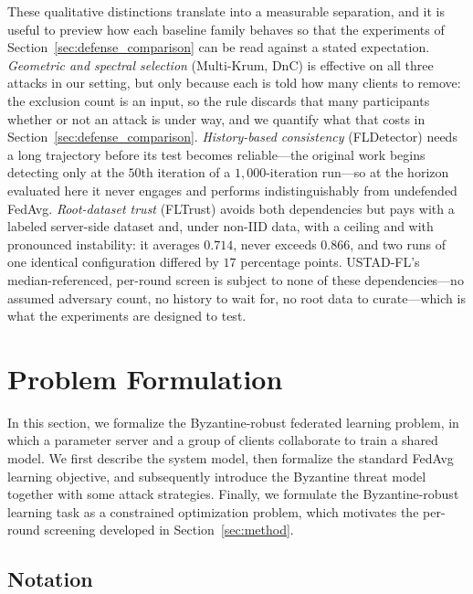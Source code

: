 \documentclass[journal]{IEEEtran}
\begin{document}
These qualitative distinctions translate into a measurable separation, and it is useful to preview how each baseline family behaves so that the experiments of Section~\ref{sec:defense_comparison} can be read against a stated expectation. \emph{Geometric and spectral selection} (Multi-Krum, DnC) is effective on all three attacks in our setting, but only because each is told how many clients to remove: the exclusion count is an input, so the rule discards that many participants whether or not an attack is under way, and we quantify what that costs in Section~\ref{sec:defense_comparison}. \emph{History-based consistency} (FLDetector) needs a long trajectory before its test becomes reliable---the original work begins detecting only at the $50$th iteration of a $1{,}000$-iteration run---so at the horizon evaluated here it never engages and performs indistinguishably from undefended FedAvg. \emph{Root-dataset trust} (FLTrust) avoids both dependencies but pays with a labeled server-side dataset and, under non-IID data, with a ceiling and with pronounced instability: it averages $0.714$, never exceeds $0.866$, and two runs of one identical configuration differed by $17$ percentage points. USTAD-FL's median-referenced, per-round screen is subject to none of these dependencies---no assumed adversary count, no history to wait for, no root data to curate---which is what the experiments are designed to test.

\section{Problem Formulation}
\label{sec:formulation}

In this section, we formalize the Byzantine-robust federated learning problem, in which a parameter server and a group of clients collaborate to train a shared model. We first describe the system model, then formalize the standard FedAvg learning objective, and subsequently introduce the Byzantine threat model together with some attack strategies. Finally, we formulate the Byzantine-robust learning task as a constrained optimization problem, which motivates the per-round screening developed in Section~\ref{sec:method}.

\subsection{Notation}
\end{document}
